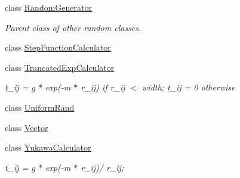 \begin{DoxyCompactItemize}
class \hyperlink{class_p_c_a_1_1_random_generator}{Random\+Generator}
\begin{DoxyCompactList}\small\item\em Parent class of other random classes. \end{DoxyCompactList}\item 
class \hyperlink{class_p_c_a_1_1_step_function_calculator}{Step\+Function\+Calculator}
\item 
class \hyperlink{class_p_c_a_1_1_trancated_exp_calculator}{Trancated\+Exp\+Calculator}
\begin{DoxyCompactList}\small\item\em t\+\_\+ij = g $\ast$ exp(-\/m $\ast$ r\+\_\+ij) if r\+\_\+ij $<$ width; t\+\_\+ij = 0 otherwise \end{DoxyCompactList}\item 
class \hyperlink{class_p_c_a_1_1_uniform_rand}{Uniform\+Rand}
\item 
class \hyperlink{class_p_c_a_1_1_vector}{Vector}
\item 
class \hyperlink{class_p_c_a_1_1_yukawa_calculator}{Yukawa\+Calculator}
\begin{DoxyCompactList}\small\item\em t\+\_\+ij = g $\ast$ exp(-\/m $\ast$ r\+\_\+ij)/ r\+\_\+ij; \end{DoxyCompactList}\end{DoxyCompactItemize}
